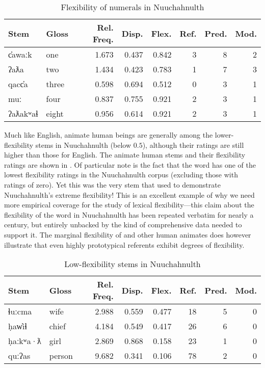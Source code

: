 \begin{table}
  \centering
  \caption{Flexibility of numerals in Nuuchahnulth}
  \label{tab:Nuuchahnulth-numerals}
  \begin{tabular}{ l l r r r r r r }
    \toprule
    Stem & Gloss & Rel. Freq. & Disp. & Flex. & Ref. & Pred. & Mod.\\
    \midrule
    c̓awaːk   & one   & 1.673 & 0.437 & 0.842 & 3 & 8 & 2\\
    ʔaƛa     & two   & 1.434 & 0.423 & 0.783 & 1 & 7 & 3\\
    qacc̓a    & three & 0.598 & 0.694 & 0.512 & 0 & 3 & 1\\
    muː      & four  & 0.837 & 0.755 & 0.921 & 2 & 3 & 1\\
    ʔaƛakʷaɬ & eight & 0.956 & 0.614 & 0.921 & 2 & 3 & 1\\
    \bottomrule
  \end{tabular}
\end{table}

Much like English, animate human beings are generally among the lower-flexibility stems in Nuuchahnulth (below $0.5$), although their ratings are still higher than those for English. The animate human stems and their flexibility ratings are shown in . Of particular note is the fact that the word   has one of the lowest flexibility ratings in the Nuuchahnulth corpus (excluding those with ratings of zero). Yet this was the very stem that \textcite{Swadesh1939b} used to demonstrate Nuuchahnulth's extreme flexibility! This is an excellent example of why we need more empirical coverage for the study of lexical flexibility—this claim about the flexibility of the word  in Nuuchahnulth has been repeated verbatim for nearly a century, but entirely unbacked by the kind of comprehensive data needed to support it. The marginal flexibility of  and other human animates does however illustrate that even highly prototypical referents exhibit degrees of flexibility.

\begin{table}
  \centering
  \caption{Low-flexibility stems in Nuuchahnulth}
  \label{tab:Nuuchahnulth-low-flexibility}
  \begin{tabular}{ l l r r r r r r }
    \toprule
    Stem     & Gloss  & Rel. Freq. & Disp. & Flex. & Ref. & Pred. & Mod.\\
    \midrule
    ɬuːcma   & wife   & 2.988      & 0.559 & 0.477 & 18   & 5     & 0  \\
    ḥaw̓iɬ    & chief  & 4.184      & 0.549 & 0.417 & 26   & 6     & 0  \\
    ḥaːkʷa·ƛ & girl   & 2.869      & 0.868 & 0.158 & 23   & 1     & 0  \\
    quːʔas   & person & 9.682      & 0.341 & 0.106 & 78   & 2     & 0  \\
    \bottomrule
  \end{tabular}
\end{table}

